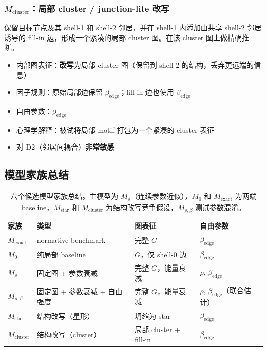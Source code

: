 \documentclass[11pt,a4paper]{ctexart}
\begin{document}
\subsubsection{$M_\mathrm{cluster}$：局部 cluster / junction-lite 改写}

保留目标节点及其 shell-1 和 shell-2 邻居，并在 shell-1 内添加由共享 shell-2 邻居诱导的 fill-in 边，形成一个紧凑的局部 cluster 图。在该 cluster 图上做精确推断。

\begin{itemize}
    \item 内部图表征：\textbf{改写}为局部 cluster 图（保留到 shell-2 的结构，丢弃更远端的信息）
    \item 因子规则：原始局部边保留 $\beta_\mathrm{edge}$；fill-in 边也使用 $\beta_\mathrm{edge}$
    \item 自由参数：$\beta_\mathrm{edge}$
    \item 心理学解释：被试将局部 motif 打包为一个紧凑的 cluster 表征
    \item 对 D2（邻居间耦合）\textbf{非常敏感}
\end{itemize}

\subsection{模型家族总结}

\begin{table}[H]
\centering\small
\begin{tabular}{llll}
\toprule
家族 & 类型 & 图表征 & 自由参数 \\
\midrule
$M_\mathrm{exact}$ & normative benchmark & 完整 $G$ & $\beta_\mathrm{edge}$ \\
$M_0$ & 纯局部 baseline & $G$，仅 shell-0 边 & $\beta_\mathrm{edge}$ \\
$M_\rho$ & 固定图 + 参数衰减 & 完整 $G$，能量衰减 & $\rho,\,\beta_\mathrm{edge}$ \\
$M_{\rho,\beta}$ & 固定图 + 参数衰减 + 自由强度 & 完整 $G$，能量衰减 & $\rho,\,\beta_\mathrm{edge}$（联合估计） \\
$M_\mathrm{star}$ & 结构改写（星形） & 坍缩为 star & $\beta_\mathrm{edge}$ \\
$M_\mathrm{cluster}$ & 结构改写（cluster） & 局部 cluster + fill-in & $\beta_\mathrm{edge}$ \\
\bottomrule
\end{tabular}
\caption{六个候选模型家族总结。主模型为 $M_\rho$（连续参数近似），$M_0$ 和 $M_\mathrm{exact}$ 为两端 baseline，$M_\mathrm{star}$ 和 $M_\mathrm{cluster}$ 为结构改写竞争假设，$M_{\rho,\beta}$ 测试参数混淆。}
\label{tab:families}
\end{table}
\end{document}
